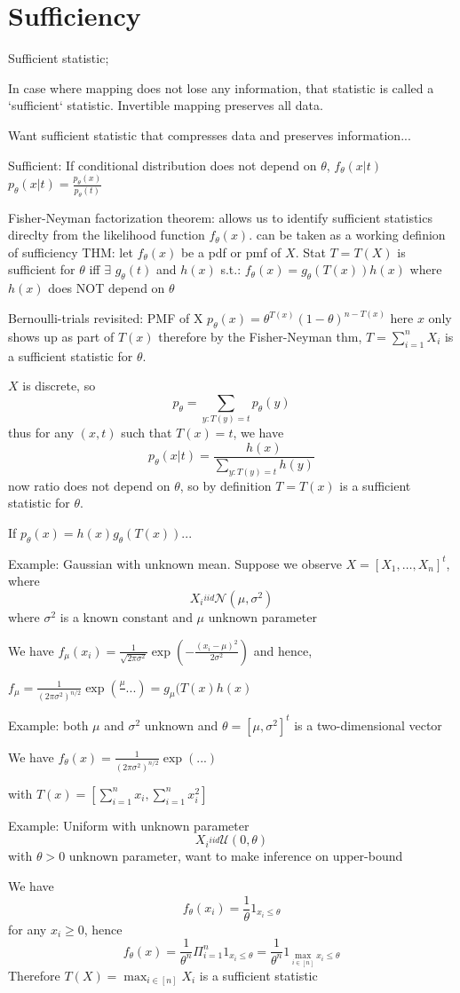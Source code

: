 \chapter{Sufficiency}

Sufficient statistic;

In case where mapping does not lose any information, that statistic is called a `sufficient` statistic.
Invertible mapping preserves all data.

Want sufficient statistic that compresses data and preserves information...

Sufficient: If conditional distribution does not depend on $\theta$, $f_\theta (x | t)$
$p_\theta (x | t) = \frac{p_\theta (x)}{p_\theta(t)}$

Fisher-Neyman factorization theorem:
allows us to identify sufficient statistics direclty from the likelihood function $f_\theta(x)$.
can be taken as a working definion of sufficiency
THM: let $f_\theta(x)$ be a pdf or pmf of $X$. Stat $T = T(X)$ is sufficient for $\theta$ iff $\exists$ $g_\theta(t)$ and $h(x)$ s.t.: $f_\theta(x) = g_\theta(T(x))h(x)$
where $h(x)$ does NOT depend on $\theta$

Bernoulli-trials revisited: PMF of X $p_\theta(x) = \theta^{T(x)} (1 - \theta)^{n - T(x)}$
here $x$ only shows up as part of $T(x)$
therefore by the Fisher-Neyman thm, $T = \sum_{i=1}^n X_i$ is a sufficient statistic for $\theta$.

$X$ is discrete, so
\[
    p_\theta = \sum_{y:T(y)=t} p_\theta(y)
\]
thus for any $(x, t)$ such that $T(x)=t$, we have
\[
    p_\theta(x | t) = \frac{h(x)}{\sum_{y:T(y)=t}h(y)}
\]
now ratio does not depend on $\theta$, so by definition $T=T(x)$ is a sufficient statistic for $\theta$.

If $p_\theta(x) = h(x) g_\theta(T(x))$...

Example: Gaussian with unknown mean. Suppose we observe $X = [X_1, \dots, X_n]^t$, where
\[
    X_i \overset{iid}{~} \mathcal{N}(\mu, \sigma^2)
\]
where $\sigma^2$ is a known constant and $\mu$ unknown parameter

We have $f_\mu(x_i) = \frac{1}{\sqrt{2 \pi \sigma^2}} \exp \left(- \frac{(x_i - \mu)^2}{2\sigma^2}\right)$ and hence,

$f_\mu = \frac{1}{(2\pi \sigma^2)^{n/2}} \exp \left( \frac{\mu}{}... \right) = g_\mu(T(x)h(x)$

Example: both $\mu$ and $\sigma^2$ unknown and $\theta = [\mu, \sigma^2]^t$ is a two-dimensional vector

We have $f_\theta(x) = \frac{1}{(2\pi \sigma^2)^{n/2}} \exp \left( ... \right)$

with $T(x) = [\sum_{i=1}^n x_i, \sum_{i=1}^n x_i^2]$

Example: Uniform with unknown parameter
\[
    X_i \overset{iid}{~} \mathcal{U}(0, \theta)
\]
with $\theta > 0$ unknown parameter, want to make inference on upper-bound

We have
\[
    f_\theta(x_i) = \frac{1}{\theta} 1_{x_i \leq \theta}
\]
for any $x_i \geq 0$, hence
\[
    f_\theta(x) = \frac{1}{\theta^n} \Pi_{i=1}^n 1_{x_i \leq \theta} = \frac{1}{\theta^n}1_{\max_{i \in [n]} x_i \leq \theta}
\]
Therefore $T(X) = \max_{i \in [n]} X_i$ is a sufficient statistic
